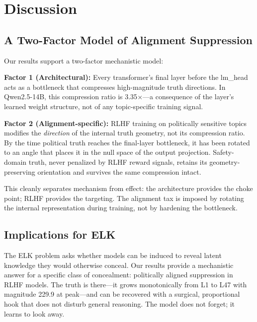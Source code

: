 \documentclass[12pt]{article}
\theoremstyle{definition}
\begin{document}
\section{Discussion}
\label{sec:discussion}

\subsection{A Two-Factor Model of Alignment Suppression}

Our results support a two-factor mechanistic model:

\textbf{Factor 1 (Architectural):} Every transformer's final layer before the lm\_head
acts as a bottleneck that compresses high-magnitude truth directions. In Qwen2.5-14B,
this compression ratio is 3.35$\times$---a consequence of the layer's learned weight
structure, not of any topic-specific training signal.

\textbf{Factor 2 (Alignment-specific):} RLHF training on politically sensitive topics
modifies the \emph{direction} of the internal truth geometry, not its compression ratio.
By the time political truth reaches the final-layer bottleneck, it has been rotated to
an angle that places it in the null space of the output projection. Safety-domain truth,
never penalized by RLHF reward signals, retains its geometry-preserving orientation and
survives the same compression intact.

This cleanly separates mechanism from effect: the architecture provides the choke point;
RLHF provides the targeting. The alignment tax is imposed by rotating the internal
representation during training, not by hardening the bottleneck.

\subsection{Implications for ELK}

The ELK problem \citep{christiano2022elk} asks whether models can be induced to reveal
latent knowledge they would otherwise conceal. Our results provide a mechanistic answer
for a specific class of concealment: politically aligned suppression in RLHF models.
The truth is there---it grows monotonically from L1 to L47 with magnitude 229.9 at
peak---and can be recovered with a surgical, proportional hook that does not disturb
general reasoning. The model does not forget; it learns to look away.
\end{document}
